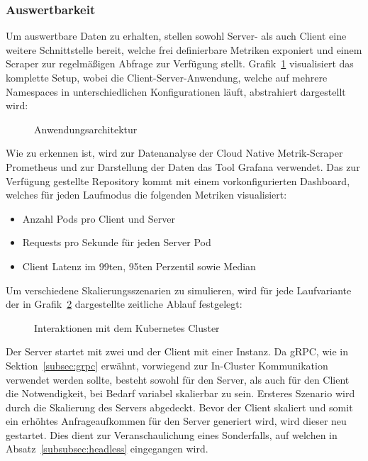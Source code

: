 \subsubsection{Auswertbarkeit}\label{subsubsec:auswertbarkeit}
Um auswertbare Daten zu erhalten, stellen sowohl Server- als auch Client eine weitere Schnittstelle bereit, welche frei definierbare Metriken exponiert und einem Scraper zur regelmäßigen Abfrage zur Verfügung stellt.
Grafik~\ref{fig:setup} visualisiert das komplette Setup, wobei die Client-Server-Anwendung, welche auf mehrere Namespaces in unterschiedlichen Konfigurationen läuft, abstrahiert dargestellt wird:

\begin{figure}[H]
    \centering
    
    \caption{Anwendungsarchitektur}
    \label{fig:setup}
\end{figure}

Wie zu erkennen ist, wird zur Datenanalyse der Cloud Native Metrik-Scraper Prometheus und zur Darstellung der Daten das Tool Grafana verwendet.
Das zur Verfügung gestellte Repository kommt mit einem vorkonfigurierten Dashboard, welches für jeden Laufmodus die folgenden Metriken visualisiert:
\begin{itemize}
    \item Anzahl Pods pro Client und Server
    \item Requests pro Sekunde für jeden Server Pod
    \item Client Latenz im 99ten, 95ten Perzentil sowie Median
\end{itemize}

Um verschiedene Skalierungsszenarien zu simulieren, wird für jede Laufvariante der in Grafik~\ref{fig:zeitablauf} dargestellte zeitliche Ablauf festgelegt:

\begin{figure}[H]
    \centering
    
    \caption{Interaktionen mit dem Kubernetes Cluster}
    \label{fig:zeitablauf}
\end{figure}

Der Server startet mit zwei und der Client mit einer Instanz.
Da gRPC, wie in Sektion~\ref{subsec:grpc} erwähnt, vorwiegend zur In-Cluster Kommunikation verwendet werden sollte, besteht sowohl für den Server, als auch für den Client die Notwendigkeit, bei Bedarf variabel skalierbar zu sein.
Ersteres Szenario wird durch die Skalierung des Servers abgedeckt.
Bevor der Client skaliert und somit ein erhöhtes Anfrageaufkommen für den Server generiert wird, wird dieser neu gestartet.
Dies dient zur Veranschaulichung eines Sonderfalls, auf welchen in Absatz~\ref{subsubsec:headless} eingegangen wird.

